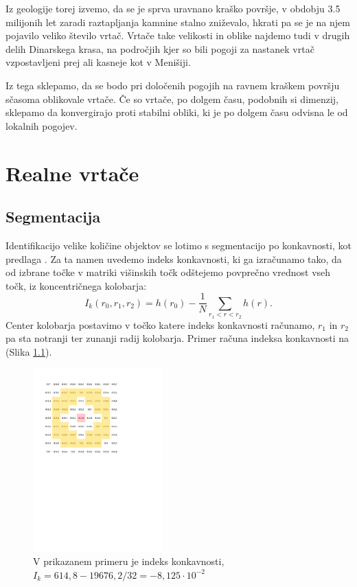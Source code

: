 \documentclass[a4paper, twoside, 12pt]{book}
\begin{document}
Iz geologije torej izvemo, da se je sprva uravnano kraško površje, v obdobju 3.5 milijonih let zaradi raztapljanja kamnine stalno zniževalo, hkrati pa se je na njem pojavilo veliko število vrtač. Vrtače take velikosti in oblike najdemo tudi v drugih delih Dinarskega krasa, na področjih kjer so bili pogoji za nastanek vrtač vzpostavljeni prej ali kasneje kot v Menišiji.

Iz tega sklepamo, da se bodo pri določenih pogojih na ravnem kraškem površju sčasoma oblikovale vrtače. Če so vrtače, po dolgem času, podobnih si dimenzij, sklepamo da konvergirajo proti stabilni obliki, ki je po dolgem času odvisna le od lokalnih pogojev.

 

  \chapter{Realne vrtače}
  \label{realne-vrtace}

  \section{Segmentacija}

  Identifikacijo velike količine objektov se lotimo s segmentacijo po konkavnosti, kot predlaga \cite{doctor13}.
Za ta namen uvedemo indeks konkavnosti, ki ga izračunamo tako, da od izbrane točke v matriki višinskih točk odštejemo povprečno vrednost vseh točk, iz koncentričnega kolobarja:
\begin{equation}  I_k(r_0,r_1,r_2) = h(r_0)- \frac{1}{N}\sum\limits_{r_1<r<r_2} h(r). \end{equation}
Center kolobarja postavimo v točko katere indeks konkavnosti računamo, $r_1$ in $r_2$ pa sta notranji ter zunanji radij kolobarja.
Primer računa indeksa konkavnosti na (Slika \ref{fig:concavity-ring}).
  \begin{figure}[h!]
    \begin{center}
      \includegraphics[width=5cm]{slike/concavity-ring-visualisation-2}
    \end{center}
    \caption{V prikazanem primeru je indeks konkavnosti, $I_k = 614,8 - 19676,2/32 = - 8,125 \cdot 10^{-2}$}
    \label{fig:concavity-ring}
  \end{figure}
\end{document}
